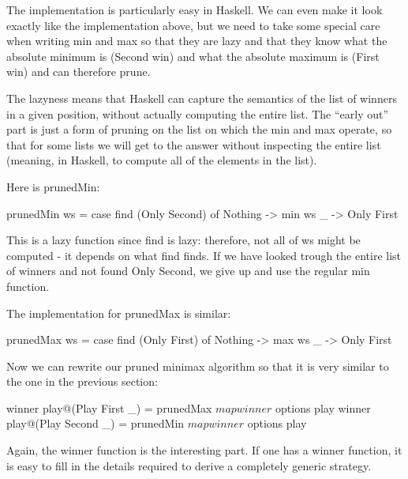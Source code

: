 The implementation is particularly easy in Haskell. We can even make it look exactly like the implementation above, but we need to take some special care when writing min and max so that they are lazy and that they know what the absolute minimum is (Second win) and what the absolute maximum is (First win) and can therefore prune.

The lazyness means that Haskell can capture the semantics of the list of winners in a given position, without actually computing the entire list.
The ``early out'' part is just a form of pruning on the list on which the min and max operate, so that for some lists we will get to the answer without inspecting the entire list (meaning, in Haskell, to compute all of the elements in the list).

Here is prunedMin:

\begin{code}
  prunedMin ws = 
    case find (Only Second) of
      Nothing -> min ws
      _ -> Only First
\end{code}

This is a lazy function since find is lazy: therefore, not all of ws might be computed - it depends on what find finds.
If we have looked trough the entire list of winners and not found Only Second, we give up and use the regular min function.

The implementation for prunedMax is similar:

\begin{code}
  prunedMax ws = 
    case find (Only First) of
      Nothing -> max ws
      _ -> Only First
\end{code}


Now we can rewrite our pruned minimax algorithm so that it is very similar to the one in the previous section:

\begin{code}
  winner play@(Play First _) = 
    prunedMax $ map winner $ options play
  winner play@(Play Second _) = 
    prunedMin $ map winner $ options play
\end{code}


Again, the winner function is the interesting part. If one has a winner function, it is easy to fill in the details required to derive a completely generic strategy.
